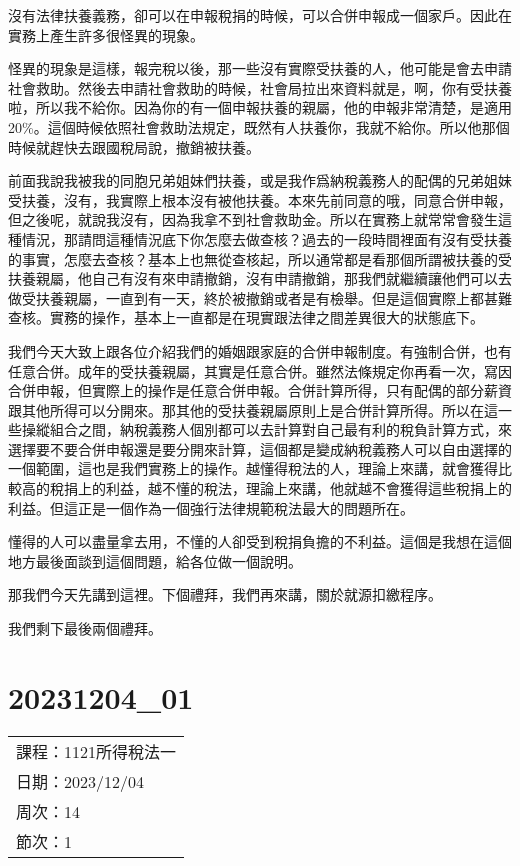 \documentclass[]{ctexbook}
\begin{document}
沒有法律扶養義務，卻可以在申報稅捐的時候，可以合併申報成一個家戶。因此在實務上產生許多很怪異的現象。

怪異的現象是這樣，報完稅以後，那一些沒有實際受扶養的人，他可能是會去申請社會救助。然後去申請社會救助的時候，社會局拉出來資料就是，啊，你有受扶養啦，所以我不給你。因為你的有一個申報扶養的親屬，他的申報非常清楚，是適用20\%。這個時候依照社會救助法規定，既然有人扶養你，我就不給你。所以他那個時候就趕快去跟國稅局說，撤銷被扶養。

前面我說我被我的同胞兄弟姐妹們扶養，或是我作爲納稅義務人的配偶的兄弟姐妹受扶養，沒有，我實際上根本沒有被他扶養。本來先前同意的哦，同意合併申報，但之後呢，就說我沒有，因為我拿不到社會救助金。所以在實務上就常常會發生這種情況，那請問這種情況底下你怎麼去做查核？過去的一段時間裡面有沒有受扶養的事實，怎麼去查核？基本上也無從查核起，所以通常都是看那個所謂被扶養的受扶養親屬，他自己有沒有來申請撤銷，沒有申請撤銷，那我們就繼續讓他們可以去做受扶養親屬，一直到有一天，終於被撤銷或者是有檢舉。但是這個實際上都甚難查核。實務的操作，基本上一直都是在現實跟法律之間差異很大的狀態底下。

我們今天大致上跟各位介紹我們的婚姻跟家庭的合併申報制度。有強制合併，也有任意合併。成年的受扶養親屬，其實是任意合併。雖然法條規定你再看一次，寫因合併申報，但實際上的操作是任意合併申報。合併計算所得，只有配偶的部分薪資跟其他所得可以分開來。那其他的受扶養親屬原則上是合併計算所得。所以在這一些操縱組合之間，納稅義務人個別都可以去計算對自己最有利的稅負計算方式，來選擇要不要合併申報還是要分開來計算，這個都是變成納稅義務人可以自由選擇的一個範圍，這也是我們實務上的操作。越懂得稅法的人，理論上來講，就會獲得比較高的稅捐上的利益，越不懂的稅法，理論上來講，他就越不會獲得這些稅捐上的利益。但這正是一個作為一個強行法律規範稅法最大的問題所在。

懂得的人可以盡量拿去用，不懂的人卻受到稅捐負擔的不利益。這個是我想在這個地方最後面談到這個問題，給各位做一個說明。

那我們今天先講到這裡。下個禮拜，我們再來講，關於就源扣繳程序。

我們剩下最後兩個禮拜。

\hypertarget{section-25}{%
\chapter{20231204\_01}\label{section-25}}

\begin{longtable}[]{@{}l@{}}
\toprule()
\endhead
課程：1121所得稅法一 \\
日期：2023/12/04 \\
周次：14 \\
節次：1 \\
\bottomrule()
\end{longtable}
\end{document}
